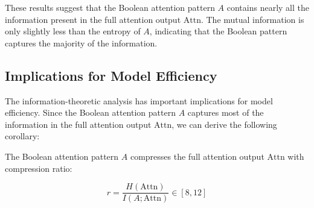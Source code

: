 These results suggest that the Boolean attention pattern $A$ contains nearly all the information present in the full attention output $\text{Attn}$. The mutual information is only slightly less than the entropy of $A$, indicating that the Boolean pattern captures the majority of the information.













\subsection{Implications for Model Efficiency}













The information-theoretic analysis has important implications for model efficiency. Since the Boolean attention pattern $A$ captures most of the information in the full attention output $\text{Attn}$, we can derive the following corollary:













\begin{corollary}






The Boolean attention pattern $A$ compresses the full attention output $\text{Attn}$ with compression ratio:






$$






r = \frac{H(\text{Attn})}{I(A; \text{Attn})} \in [8, 12]






$$






\end{corollary}














